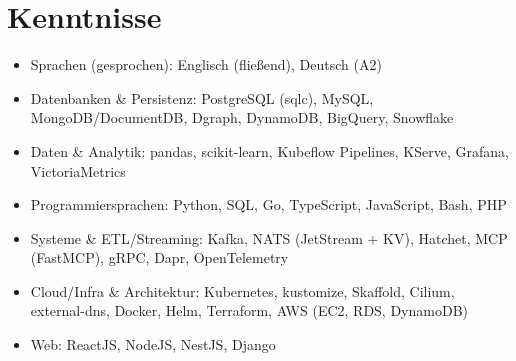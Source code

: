 \documentclass[10pt,a4paper]{resume}
\begin{document}
\section{Kenntnisse}

\begin{itemize}[leftmargin=1.4em,nosep,topsep=2pt]
  \item Sprachen (gesprochen): Englisch (fließend), Deutsch (A2)
  \item Datenbanken \& Persistenz: PostgreSQL (sqlc), MySQL, MongoDB/DocumentDB, Dgraph, DynamoDB, BigQuery, Snowflake
  \item Daten \& Analytik: pandas, scikit-learn, Kubeflow Pipelines, KServe, Grafana, VictoriaMetrics
  \item Programmiersprachen: Python, SQL, Go, TypeScript, JavaScript, Bash, PHP
  \item Systeme \& ETL/Streaming: Kafka, NATS (JetStream + KV), Hatchet, MCP (FastMCP), gRPC, Dapr, OpenTelemetry
  \item Cloud/Infra \& Architektur: Kubernetes, kustomize, Skaffold, Cilium, external-dns, Docker, Helm, Terraform, AWS (EC2, RDS, DynamoDB)
  \item Web: ReactJS, NodeJS, NestJS, Django
\end{itemize}
\end{document}
